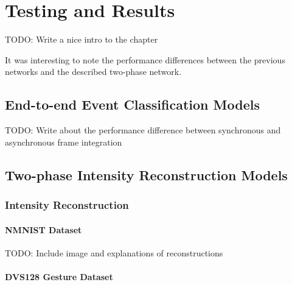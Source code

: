 \chapter{Testing and Results} \label{chap:testing_and_results}

\color{red} TODO: Write a nice intro to the chapter \color{black}

It was interesting to note the performance differences between the previous networks and the described two-phase network.

\section{End-to-end Event Classification Models}

\color{red} TODO: Write about the performance difference between synchronous and asynchronous frame integration \color{black}

\section{Two-phase Intensity Reconstruction Models}

\subsection{Intensity Reconstruction}

\subsubsection{NMNIST Dataset}

\color{red} TODO: Include image and explanations of reconstructions \color{black}

\subsubsection{DVS128 Gesture Dataset}

